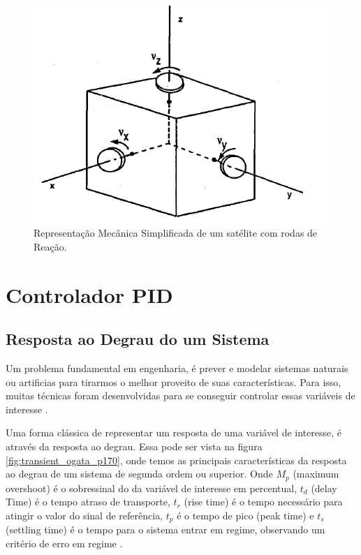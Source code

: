 \begin{figure}[!ht]
  \caption{Representação Mecânica Simplificada de um satélite com rodas de Reação.}
  \begin{center}
      \includegraphics[scale=0.75]{img/satellite_controlhand_p1306}
  \end{center}
  \label{fig:satellite_controlhand_p1306}
\end{figure}




\section{Controlador PID}

\subsection{Resposta ao Degrau do um Sistema}

Um problema fundamental em engenharia, é prever e modelar sistemas naturais ou artificias para tirarmos o melhor proveito de suas características. Para isso, muitas técnicas foram desenvolvidas para se conseguir controlar essas variáveis de interesse \cite{Levine1996}.

Uma forma clássica de representar um resposta de uma variável de interesse, é através da resposta ao degrau. Essa pode ser vista na figura \ref{fig:transient_ogata_p170}, onde temos as principais características da resposta ao degrau de um sistema de segunda ordem ou superior. Onde \textit{$M_p$} (maximum overshoot) é o sobressinal do da variável de interesse em percentual, \textit{$t_d$} (delay Time) é o tempo atraso de transporte, \textit{$t_r$} (rise time) é o tempo necessário para atingir o valor do sinal de referência, \textit{$t_p$} é o tempo de pico (peak time) e \textit{$t_s$} (settling time) é o tempo para o sistema entrar em regime, observando um critério de erro em regime \cite{Ogata}.

